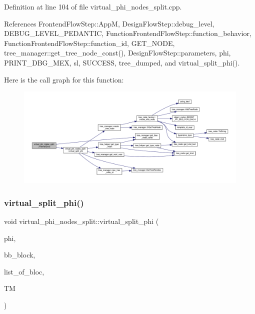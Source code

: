 Definition at line 104 of file virtual\+\_\+phi\+\_\+nodes\+\_\+split.\+cpp.



References Frontend\+Flow\+Step\+::\+AppM, Design\+Flow\+Step\+::debug\+\_\+level, D\+E\+B\+U\+G\+\_\+\+L\+E\+V\+E\+L\+\_\+\+P\+E\+D\+A\+N\+T\+IC, Function\+Frontend\+Flow\+Step\+::function\+\_\+behavior, Function\+Frontend\+Flow\+Step\+::function\+\_\+id, G\+E\+T\+\_\+\+N\+O\+DE, tree\+\_\+manager\+::get\+\_\+tree\+\_\+node\+\_\+const(), Design\+Flow\+Step\+::parameters, phi, P\+R\+I\+N\+T\+\_\+\+D\+B\+G\+\_\+\+M\+EX, sl, S\+U\+C\+C\+E\+SS, tree\+\_\+dumped, and virtual\+\_\+split\+\_\+phi().

Here is the call graph for this function\+:
\nopagebreak
\begin{figure}[H]
\begin{center}
\leavevmode
\includegraphics[width=350pt]{df/d2f/classvirtual__phi__nodes__split_a501e5736bc6234a5d835605af57e1fd5_cgraph}
\end{center}
\end{figure}
\mbox{\label{classvirtual__phi__nodes__split_a91b2c477a5cec0ee3a6882c187f03a53}} 
\subsubsection{\texorpdfstring{virtual\+\_\+split\+\_\+phi()}{virtual\_split\_phi()}}
{\footnotesize\ttfamily void virtual\+\_\+phi\+\_\+nodes\+\_\+split\+::virtual\+\_\+split\+\_\+phi (\begin{DoxyParamCaption}\item[{\hyperlink{tree__node_8hpp_a6ee377554d1c4871ad66a337eaa67fd5}{tree\+\_\+node\+Ref}}]{phi,  }\item[{bloc\+Ref \&}]{bb\+\_\+block,  }\item[{std\+::map$<$ unsigned int, bloc\+Ref $>$ \&}]{list\+\_\+of\+\_\+bloc,  }\item[{const \hyperlink{tree__manager_8hpp_a96ff150c071ce11a9a7a1e40590f205e}{tree\+\_\+manager\+Ref}}]{TM }\end{DoxyParamCaption})\hspace{0.3cm}{\ttfamily [private]}}



